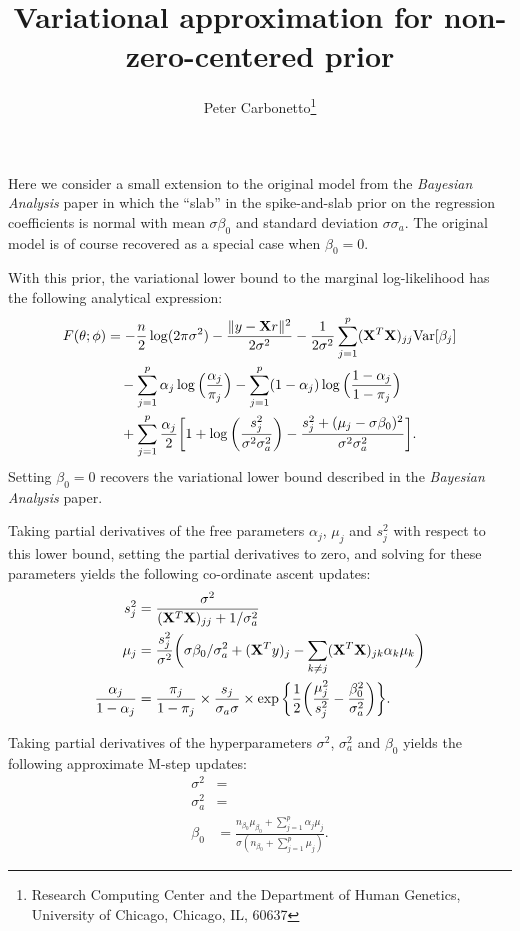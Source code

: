 \documentclass[final]{siamltex}
\title{Variational approximation for non-zero-centered prior}
\author{Peter Carbonetto\thanks{Research Computing Center and the
    Department of Human Genetics, University of Chicago, Chicago, IL,
    60637}}
\begin{document}
\maketitle

\noindent Here we consider a small extension to the original model
from the {\em Bayesian Analysis} paper in which the ``slab'' in the
spike-and-slab prior on the regression coefficients is normal with
mean $\sigma \beta_0$ and standard deviation $\sigma \sigma_a$. The
original model is of course recovered as a special case when $\beta_0
= 0$.

With this prior, the variational lower bound to the marginal
log-likelihood has the following analytical expression:
\begin{align}
F(\theta; \phi) &=
 - \frac{n}{2}\log(2\pi\sigma^2)
- \frac{\|y - {\bf X}r\|^2}{2\sigma^2} 
- \frac{1}{2\sigma^2} \sum_{j=1}^p ({\bf X}^T{\bf X})_{jj}
  \mathrm{Var}[\beta_j]
  \nonumber \\
&\quad - \sum_{j=1}^p \alpha_j \log\Big(\frac{\alpha_j}{\pi_j}\Big)
       - \sum_{j=1}^p (1-\alpha_j) \log\Big(\frac{1-\alpha_j}{1-\pi_j}\Big)
  \nonumber \\
&\quad + \sum_{j=1}^p \frac{\alpha_j}{2} \bigg[
1 + \log\bigg(\frac{s_j^2}{\sigma^2 \sigma_a^2}\bigg)
  - \frac{s_j^2 + (\mu_j - \sigma\beta_0)^2}{\sigma^2\sigma_a^2} \bigg].
\end{align}
Setting $\beta_0 = 0$ recovers the variational lower bound described
in the {\em Bayesian Analysis} paper.

Taking partial derivatives of the free parameters $\alpha_j$, $\mu_j$
and $s_j^2$ with respect to this lower bound, setting the partial
derivatives to zero, and solving for these parameters yields the
following co-ordinate ascent updates:
\begin{align}
s_j^2 &= \frac{\sigma^2}{({\bf X}^T{\bf X})_{jj} + 1/\sigma_a^2} \\
\mu_j &= \frac{s_j^2}{\sigma^2} \bigg(\sigma \beta_0/\sigma_a^2 +
  ({\bf X}^Ty)_j - \sum_{k \neq j}
  ({\bf X}^T{\bf X})_{jk} \alpha_k \mu_k \bigg) \\
\frac{\alpha_j}{1-\alpha_j} &= \frac{\pi_j}{1-\pi_j} \times 
  \frac{s_j}{\sigma_a\sigma} \times
  \exp\bigg\{\frac{1}{2}\bigg(\frac{\mu_j^2}{s_j^2}
           - \frac{\beta_0^2}{\sigma_a^2}\bigg)\bigg\}.
\end{align}

Taking partial derivatives of the hyperparameters $\sigma^2$,
$\sigma_a^2$ and $\beta_0$ yields the following approximate M-step
updates:
\begin{align}
\sigma^2   &= \\
\sigma_a^2 &= \\
\beta_0    &= \frac{n_{\beta_0}\mu_{\beta_0} + \sum_{j=1}^p \alpha_j\mu_j}
                   {\sigma(n_{\beta_0} + \sum_{j=1}^p \mu_j)}.
\end{align}
\end{document}

